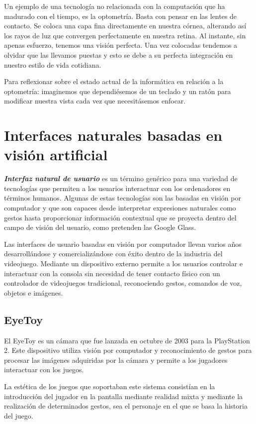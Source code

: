 Un ejemplo de una tecnología no relacionada con la computación que ha madurado con el tiempo, es la optometría. Basta con pensar en las lentes de contacto. Se coloca una capa fina directamente en nuestra córnea, alterando así los rayos de luz que convergen perfectamente en nuestra retina. Al instante, sin apenas esfuerzo, tenemos una visión perfecta. Una vez colocadas tendemos a olvidar que las llevamos puestas y esto se debe a su perfecta integración en nuestro estilo de vida cotidiana. 

Para reflexionar sobre el estado actual de la informática en relación a la optometría: imaginemos que dependiésemos de un teclado y un ratón para modificar nuestra vista cada vez que necesitásemos enfocar.

\section{Interfaces naturales basadas en visión artificial}
\textbf{\textit{Interfaz natural de usuario}} es un término genérico para una variedad de tecnologías que permiten a los usuarios interactuar con los ordenadores en términos humanos. Algunas de estas tecnologías son las basadas en visión por computador y que son capaces desde interpretar expresiones naturales como gestos hasta proporcionar información contextual que se proyecta dentro del campo de visión del usuario, como pretenden las Google Glass. 

Las interfaces de usuario basadas en visión por computador llevan varios años desarrollándose y comercializándose con éxito dentro de la industria del videojuego. Mediante un dispositivo externo permite a los usuarios controlar e interactuar con la consola sin necesidad de tener contacto físico con un controlador de videojuegos tradicional, reconociendo gestos, comandos de voz, objetos e imágenes.

\subsection{EyeToy}
El EyeToy es un cámara que fue lanzada en octubre de 2003 para la PlayStation 2. Este dispositivo utiliza visión por computador y reconocimiento de gestos para procesar las imágenes adquiridas por la cámara y permite a los jugadores interactuar con los juegos.

La estética de los juegos que soportaban este sistema consistían en la introducción del jugador en la pantalla mediante realidad mixta y mediante la realización de determinados gestos, sea el personaje en el que se basa la historia del juego. 

